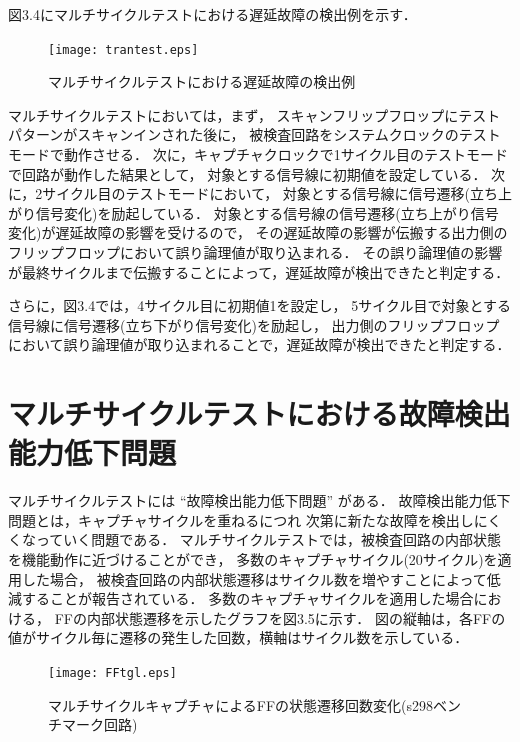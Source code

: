 図3.4にマルチサイクルテストにおける遅延故障の検出例を示す．

\begin{figure}[h]
	\begin{center}
		\texttt{[image: trantest.eps]}
		\caption{マルチサイクルテストにおける遅延故障の検出例}
	\end{center}
\end{figure}

マルチサイクルテストにおいては，まず，
スキャンフリップフロップにテストパターンがスキャンインされた後に，
被検査回路をシステムクロックのテストモードで動作させる．
次に，キャプチャクロックで1サイクル目のテストモードで回路が動作した結果として，
対象とする信号線に初期値を設定している．
次に，2サイクル目のテストモードにおいて，
対象とする信号線に信号遷移(立ち上がり信号変化)を励起している．
対象とする信号線の信号遷移(立ち上がり信号変化)が遅延故障の影響を受けるので，
その遅延故障の影響が伝搬する出力側のフリップフロップにおいて誤り論理値が取り込まれる．
その誤り論理値の影響が最終サイクルまで伝搬することによって，遅延故障が検出できたと判定する．

さらに，図3.4では，4サイクル目に初期値1を設定し，
5サイクル目で対象とする信号線に信号遷移(立ち下がり信号変化)を励起し，
出力側のフリップフロップにおいて誤り論理値が取り込まれることで，遅延故障が検出できたと判定する．

\section{マルチサイクルテストにおける故障検出能力低下問題}
マルチサイクルテストには ``故障検出能力低下問題'' がある．
故障検出能力低下問題\cite{multidemerit}とは，キャプチャサイクルを重ねるにつれ
次第に新たな故障を検出しにくくなっていく問題である．
マルチサイクルテストでは，被検査回路の内部状態を機能動作に近づけることができ，
多数のキャプチャサイクル(20サイクル)を適用した場合，
被検査回路の内部状態遷移はサイクル数を増やすことによって低減することが報告されている\cite{FFtgl}．
多数のキャプチャサイクルを適用した場合における，
FFの内部状態遷移を示したグラフを図3.5に示す．
図の縦軸は，各FFの値がサイクル毎に遷移の発生した回数，横軸はサイクル数を示している．

\begin{figure}[h]
	\begin{center}
		\texttt{[image: FFtgl.eps]}
		\caption{マルチサイクルキャプチャによるFFの状態遷移回数変化(s298ベンチマーク回路)}
	\end{center}
\end{figure}

